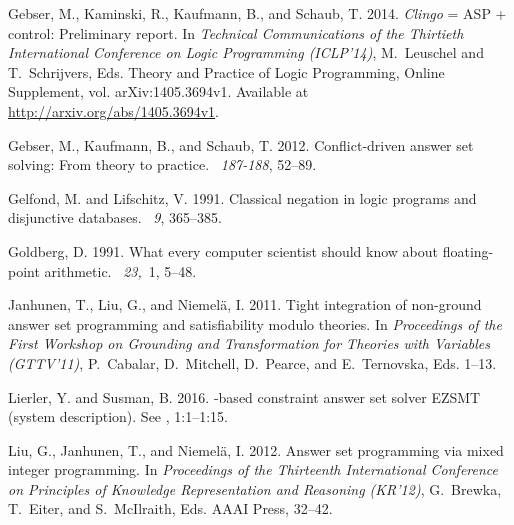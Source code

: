 \begin{thebibliography}{}
{\sc Gebser, M.}, {\sc Kaminski, R.}, {\sc Kaufmann, B.}, {\sc and} {\sc
  Schaub, T.} 2014.
\newblock \textit{Clingo} = {ASP} + control: Preliminary report.
\newblock In {\em Technical Communications of the Thirtieth International
  Conference on Logic Programming (ICLP'14)}, {M.~Leuschel} {and}
  {T.~Schrijvers}, Eds. Theory and Practice of Logic Programming, Online
  Supplement, vol. arXiv:1405.3694v1.
\newblock Available at \url{http://arxiv.org/abs/1405.3694v1}.

{\sc Gebser, M.}, {\sc Kaufmann, B.}, {\sc and} {\sc Schaub, T.} 2012.
\newblock Conflict-driven answer set solving: From theory to practice.
~{\em 187-188}, 52--89.

{\sc Gelfond, M.} {\sc and} {\sc Lifschitz, V.} 1991.
\newblock Classical negation in logic programs and disjunctive databases.
~{\em 9}, 365--385.

{\sc Goldberg, D.} 1991.
\newblock What every computer scientist should know about floating-point
  arithmetic.
~{\em 23,\/}~1, 5--48.

{\sc Janhunen, T.}, {\sc Liu, G.}, {\sc and} {\sc Niemelä, I.} 2011.
\newblock Tight integration of non-ground answer set programming and
  satisfiability modulo theories.
\newblock In {\em Proceedings of the First Workshop on Grounding and
  Transformation for Theories with Variables (GTTV'11)}, {P.~Cabalar},
  {D.~Mitchell}, {D.~Pearce}, {and} {E.~Ternovska}, Eds. 1--13.

{\sc Lierler, Y.} {\sc and} {\sc Susman, B.} 2016.
-based constraint answer set solver {EZSMT} (system
  description).
\newblock See , 1:1--1:15.

{\sc Liu, G.}, {\sc Janhunen, T.}, {\sc and} {\sc Niemelä, I.} 2012.
\newblock Answer set programming via mixed integer programming.
\newblock In {\em Proceedings of the Thirteenth International Conference on
  Principles of Knowledge Representation and Reasoning (KR'12)}, {G.~Brewka},
  {T.~Eiter}, {and} {S.~McIlraith}, Eds. AAAI Press, 32--42.


\end{thebibliography}
